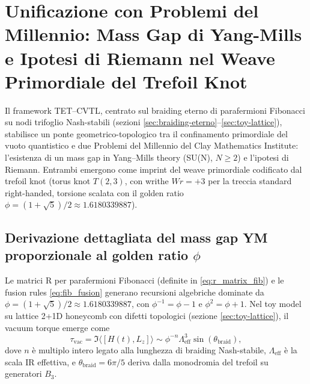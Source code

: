 \documentclass[11pt,a4paper]{article}
\let\oldref\ref
\renewcommand{\ref}{\protect\oldref}
\theoremstyle{plain}
\theoremstyle{definition}
\begin{document}
\section{Unificazione con Problemi del Millennio: Mass Gap di Yang-Mills e Ipotesi di Riemann nel Weave Primordiale del Trefoil Knot}
\label{sec:millennium-unification}

Il framework TET--CVTL, centrato sul braiding eterno di parafermioni Fibonacci su nodi trifoglio Nash-stabili (sezioni \ref{sec:braiding-eterno}--\ref{sec:toy-lattice}), stabilisce un ponte geometrico-topologico tra il confinamento primordiale del vuoto quantistico e due Problemi del Millennio del Clay Mathematics Institute: l'esistenza di un mass gap in Yang--Mills theory (SU(N), $N \geq 2$) e l'ipotesi di Riemann. Entrambi emergono come imprint del weave primordiale codificato dal trefoil knot (torus knot $T(2,3)$, con writhe $Wr = +3$ per la treccia standard right-handed, torsione scalata con il golden ratio $\phi = (1 + \sqrt{5})/2 \approx 1.6180339887$).










\subsection{Derivazione dettagliata del mass gap YM proporzionale al golden ratio $\phi$}

Le matrici R per parafermioni Fibonacci (definite in \ref{eq:r_matrix_fib}) e le fusion rules \ref{eq:fib_fusion} generano recursioni algebriche dominate da $\phi = (1 + \sqrt{5})/2 \approx 1.6180339887$, con $\phi^{-1} = \phi - 1$ e $\phi^2 = \phi + 1$. Nel toy model su lattice 2+1D honeycomb con difetti topologici (sezione \ref{sec:toy-lattice}), il vacuum torque emerge come
\begin{equation}
\tau_{\text{vac}} = \Im \langle [H(t), L_z] \rangle \sim \phi^{-n} \Lambda_{\text{eff}}^3 \sin(\theta_{\text{braid}}),
\label{eq:vac_torque_phi}
\end{equation}
dove $n$ è multiplo intero legato alla lunghezza di braiding Nash-stabile, $\Lambda_{\text{eff}}$ è la scala IR effettiva, e $\theta_{\text{braid}} = 6\pi/5$ deriva dalla monodromia del trefoil su generatori $B_3$.
\end{document}
